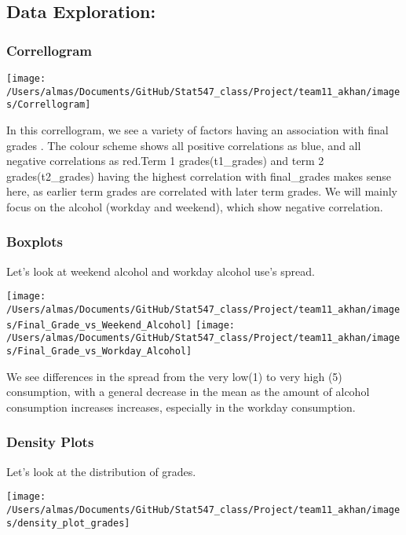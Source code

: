 \documentclass[]{article}
\begin{document}
\hypertarget{data-exploration}{%
\subsection{Data Exploration:}\label{data-exploration}}

\hypertarget{correllogram}{%
\subsubsection{Correllogram}\label{correllogram}}

\texttt{[image: /Users/almas/Documents/GitHub/Stat547\_class/Project/team11\_akhan/images/Correllogram]}

In this correllogram, we see a variety of factors having an association
with final grades . The colour scheme shows all positive correlations as
blue, and all negative correlations as red.Term 1 grades(t1\_grades) and
term 2 grades(t2\_grades) having the highest correlation with
final\_grades makes sense here, as earlier term grades are correlated
with later term grades. We will mainly focus on the alcohol (workday and
weekend), which show negative correlation.

\hypertarget{boxplots}{%
\subsubsection{Boxplots}\label{boxplots}}

Let's look at weekend alcohol and workday alcohol use's spread.

\texttt{[image: /Users/almas/Documents/GitHub/Stat547\_class/Project/team11\_akhan/images/Final\_Grade\_vs\_Weekend\_Alcohol]}
\texttt{[image: /Users/almas/Documents/GitHub/Stat547\_class/Project/team11\_akhan/images/Final\_Grade\_vs\_Workday\_Alcohol]}

We see differences in the spread from the very low(1) to very high (5)
consumption, with a general decrease in the mean as the amount of
alcohol consumption increases increases, especially in the workday
consumption.

\hypertarget{density-plots}{%
\subsubsection{Density Plots}\label{density-plots}}

Let's look at the distribution of grades.

\texttt{[image: /Users/almas/Documents/GitHub/Stat547\_class/Project/team11\_akhan/images/density\_plot\_grades]}
\end{document}
